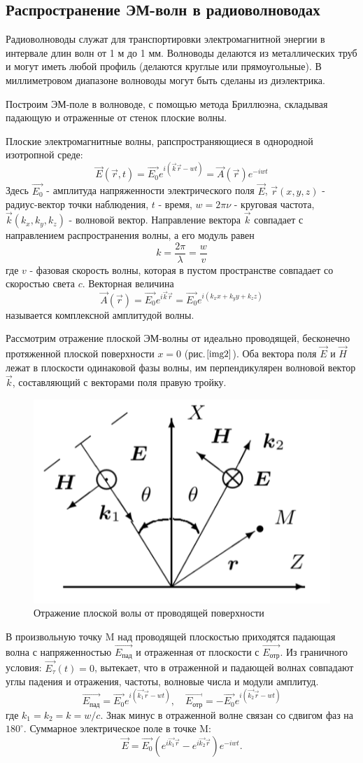 \documentclass[a4paper,12pt]{article}
\begin{document}
\subsection{Распространение ЭМ-волн в радиоволноводах}

Радиоволноводы служат для транспортировки электромагнитной энергии в интервале длин волн от 1 м до 1 мм. Волноводы делаются из металлических труб и могут иметь любой профиль (делаются круглые или прямоугольные). В миллиметровом диапазоне волноводы могут быть сделаны из диэлектрика. 

Построим ЭМ-поле в волноводе, с помощью метода Бриллюэна, складывая падающую и отраженные от стенок плоские волны.

Плоские электромагнитные волны, рапспространяющиеся в однородной изотропной среде:
$$
\vec{E}(\vec{r}, t) = \vec{E_0} e^{i(\vec{k}\vec{r}-wt)} = \vec{A}(\vec{r})e^{-iwt}
$$
Здесь $\vec{E_0}$ - амплитуда напряженности электрического поля $\vec{E}$, $\vec{r}(x,y,z)$ - радиус-вектор точки наблюдения, $t$ - время, $w = 2\pi\nu$ - круговая частота, $\vec{k}(k_x,k_y,k_z)$ - волновой вектор. Направление вектора $\vec{k}$ совпадает с направлением распространения волны, а его модуль равен 
$$k = \frac{2\pi}{\lambda}=\frac{w}{v}$$
где $v$ - фазовая скорость волны, которая в пустом пространстве совпадает со скоростью света $c$. Векторная величина
$$\vec{A}(\vec{r})=\vec{E_0} e^{i\vec{k}\vec{r}} = \vec{E_0}e^{i(k_xx+k_yy+k_zz)}$$
называется комплексной амплитудой волны.

Рассмотрим отражение плоской ЭМ-волны от идеально проводящей, бесконечно протяженной плоской поверхности $x = 0$ (рис.$\ref{img2}$). Оба вектора поля $\vec{E}$ и $\vec{H}$ лежат в плоскости одинаковой фазы волны, им перпендикулярен волновой вектор $\vec{k}$, составляющий с векторами поля правую тройку.

\begin{figure}[h]
\centering
\includegraphics[width=0.3\linewidth]{img2.png}
\caption{Отражение плоской волы от проводящей поверхности}
\label{img2}
\end{figure}

В произвольную точку M над проводящей плоскостью приходятся падающая волна с напряженностью $\vec{E_\text{пад}}$ и отраженная от плоскости с $\vec{E_\text{отр}}$. Из граничного условия: $\vec{E_\tau}(t) = 0$, вытекает, что в отраженной и падающей волнах совпадают углы падения и отражения, частоты, волновые числа и модули амплитуд.
$$
\vec{E_\text{пад}} = \vec{E_0}e^{i(\vec{k_1}\vec{r}-wt)}, \quad \vec{E_\text{отр}} = -\vec{E_0}e^{i(\vec{k_2}\vec{r}-wt)}
$$
где $k_1=k_2=k=w/c$. Знак минус в отраженной волне связан со сдвигом фаз на $180^\circ$. Суммарное электрическое поле в точке M:
$$
\vec{E} = \vec{E_0}(e^{i\vec{k_1}\vec{r}}-e^{i\vec{k_2}\vec{r}})e^{-iwt}.
$$
\end{document}
